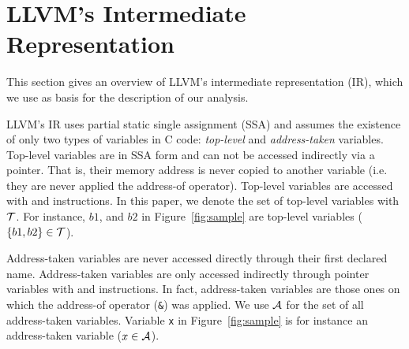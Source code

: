 \section{LLVM's Intermediate Representation}\label{sec:llvm}

This section gives an overview of LLVM's intermediate
representation (IR), which we use as basis for the
description of our analysis.

LLVM's IR uses partial static single assignment (SSA)
and assumes the existence of only two types of variables
in C code: \textit{top-level} and \textit{address-taken}
variables.
Top-level variables are in SSA form and can not be
accessed indirectly via a pointer. That is, their memory
address is never copied to another variable (i.e. they are
never applied the address-of operator). Top-level variables
are accessed with \alloct and \copyt instructions.
In this paper, we denote the set of top-level variables
with $\mathcal{T}$. For instance, $b1$, and $b2$ in Figure~\ref{fig:sample}
are top-level variables ($\{b1, b2\} \in \mathcal{T}$).

Address-taken variables are never accessed directly through
their first declared name. Address-taken variables are only
accessed indirectly through pointer variables with \loadt and
\storet instructions. In fact, address-taken variables
are those ones on which the address-of operator (\texttt{\&})
was applied. We use $\mathcal{A}$ for the set of all address-taken
variables. Variable \texttt{x} in Figure~\ref{fig:sample} is
for instance an address-taken variable ($x \in \mathcal{A}$).

\begin{comment}
We capture program elements using the following abstract
instructions:
\begin{itemize}
\item $\copydef$: copy instruction. $p, q \in \Aset$.
\item $\loaddef$: load instruction. $q \in \Aset$.
\item $\addrofdef$: address-of operator. $p \in \Aset, a \in \Pset$.
\item $\storedef$: store instruction. $p \in \Aset, q \in \Pset$.
\item $\sourcedef$: call to a taint source function. $r \in \Pset$
\item $\calldef$: call to a function. $r \in \Pset$
\item $\sinkdef$: call to sink function. $r \in \Pset$
\end{itemize}
\end{comment}

